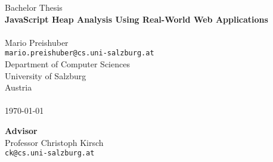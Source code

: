 \documentclass[10pt,fleqn, titlepage]{article}
\begin{document}
	
	
	\begin{titlepage}
		\centering

		\vspace*{\fill}
		{\LARGE 
		Bachelor Thesis									\\ \bigskip
		\textbf{JavaScript Heap Analysis 
				Using Real-World Web Applications}}		\\ \bigskip
		~ \\ \bigskip
		\Large Mario Preishuber 						\\ \smallskip
		\large
		\texttt{mario.preishuber@cs.uni-salzburg.at}	\\ \bigskip
		Department of Computer Sciences					\\ \smallskip			
		University of Salzburg							\\ \smallskip
		Austria											\\ \bigskip 
		~ \\ \bigskip
		\today
		\vspace*{\fill}
		
		\textbf{Advisor} 								\\ \bigskip
		Professor Christoph Kirsch						\\ \smallskip
		\texttt{ck@cs.uni-salzburg.at}					\\ \bigskip
	\end{titlepage}
	
	
	
	
	
	
	
	
	
	
	
	
	
	
	\appendix
	
	
	
	
\end{document}
